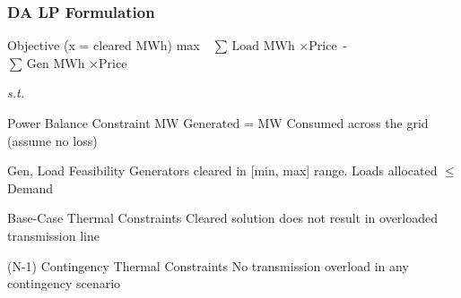 \documentclass[
    11pt,
]{beamer}
\begin{document}
\begin{frame}
    \frametitle{DA LP Formulation}
    \small
 
    \begin{alertblock}{Objective (x = cleared MWh)}
        max $\text{ }\sum{\text{Load MWh } \times \text{Price}}$ - $\sum{\text{Gen MWh } \times \text{Price}}$
    \end{alertblock}

    \vspace{-0.4em}

    \textit{s.t.}

    \vspace{-0.5em}

    \begin{block}{Power Balance Constraint}
        MW Generated = MW Consumed across the grid (assume no loss)
    \end{block}

    \vspace{-0.6em}

    \begin{exampleblock}{Gen, Load Feasibility}
        Generators cleared in [min, max] range. Loads allocated $\leq$ Demand
    \end{exampleblock}

    \vspace{-0.6em}

    \begin{block}{Base-Case Thermal Constraints}
        Cleared solution does not result in overloaded transmission line
    \end{block}

    \vspace{-0.6em}

    \begin{exampleblock}{(N-1) Contingency Thermal Constraints}
        No transmission overload in any contingency scenario
    \end{exampleblock}
    
\end{frame}

\end{document}
